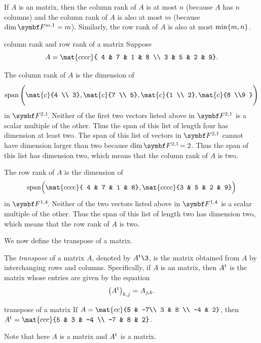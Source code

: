 If $A$ is an  matrix, then the column rank of $A$ is at most $n$ (because $A$ has $n$ columns) and the column rank of $A$ is also at most $m$ (because $\dim \F{m,1} = m$). Similarly, the row rank of $A$ is also at most $\min \br{m,n}$.

\begin{example}[rowcolrank]{column rank and row rank of a\/  matrix}
Suppose
\vspace{-.06in} %
\[
A = \mat{cccc}{
4 & 7 & 1 & 8 \\
3 & 5 & 2 & 9}.
\]

The column rank of $A$ is the dimension of
\[
\Span \left( \rule{0bp}{18.5bp} \mat{c}{4 \\ 3}, \mat{c}{7 \\ 5}, \mat{c}{1 \\ 2}, \mat{c}{8 \\9 } \right)
\vspace{-.01in} %
\]
in $\FF{2,1}$. Neither of the first two vectors listed above in $\F{2,1}$ is a scalar multiple of the other. Thus the span of this list of length four has dimension at least two. The span of this list of vectors in $\F{2,1}$ cannot have dimension larger than two because $\dim \FF{2,1} = 2$. Thus the span of this list has dimension two, which means that the column rank of $A$ is two.

The row rank of $A$ is the dimension of
\[
\Span \Bigl( \mat{cccc}{
4 & 7 & 1 & 8}, \mat{cccc}{3 & 5 & 2 & 9} \Bigr)
\vspace{-.01in} %
\]
in $\FF{1, 4}$. Neither of the two vectors listed above in $\F{1, 4}$ is a scalar multiple of the other. Thus the span of this list of length two has dimension two, which means that the row rank of $A$ is two.
\end{example}

We now define the transpose of a matrix.

{The \emph{transpose} of a matrix $A$, denoted by $\tran{A}\3$, is the matrix obtained from $A$ by interchanging rows and columns. Specifically, if $A$ is an  matrix, then $\tran{A}$ is the  matrix whose entries are given by the equation
\[
\paren[\big]{\tran{A}}_{k,j} = A_{j, k}.
\]
}

\pagebreak[3]

\begin{example}{transpose of a matrix}
\vspace{-0.06in} %
If $A = \mat{cc}{5 & -7\\ 3 & 8 \\ -4 & 2}$, then
$\tran{A} = \mat{ccc}{5 & 3 & -4 \\ -7 & 8 & 2}$.

Note that here $A$ is a  matrix and $\tran{A}$ is a  matrix.
\end{example}

